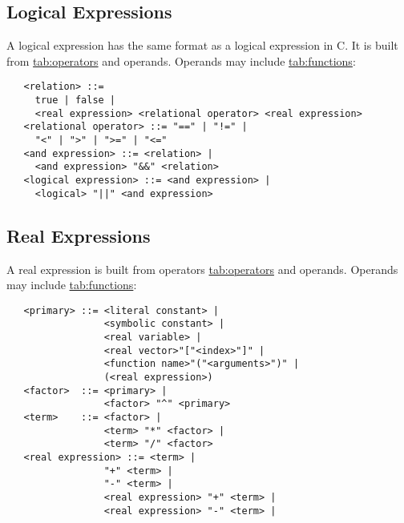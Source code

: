 \documentclass{article}
\newcommand{\tabref}[2]{\hyperref{#1}{#1 (see Table~}{)}{tab:#2}}
\begin{document}
\subsection{Logical Expressions}
\label{sec:logical}
A logical expression has the same format as a logical expression in C.
It is built from \tabref{operators}{operators} and operands.
Operands may include \tabref{functions}{functions}:
\begin{verbatim}
   <relation> ::=
     true | false |
     <real expression> <relational operator> <real expression>
   <relational operator> ::= "==" | "!=" |
     "<" | ">" | ">=" | "<="
   <and expression> ::= <relation> |
     <and expression> "&&" <relation>
   <logical expression> ::= <and expression> |
     <logical> "||" <and expression>
\end{verbatim}

\subsection{Real Expressions}
\label{sec:real}

A real expression is built from operators \tabref{operators}{operators} and 
operands. Operands may include
\tabref{functions}{functions}:

\begin{verbatim}
   <primary> ::= <literal constant> |
                 <symbolic constant> |
                 <real variable> |
                 <real vector>"["<index>"]" |
                 <function name>"("<arguments>")" |
                 (<real expression>)
   <factor>  ::= <primary> |
                 <factor> "^" <primary>
   <term>    ::= <factor> |
                 <term> "*" <factor> |
                 <term> "/" <factor>
   <real expression> ::= <term> |
                 "+" <term> |
                 "-" <term> |
                 <real expression> "+" <term> |
                 <real expression> "-" <term> |
\end{verbatim}
\end{document}
